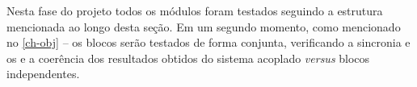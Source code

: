 Nesta fase do projeto todos os módulos foram testados seguindo a estrutura mencionada ao longo desta seção. Em um segundo momento, como mencionado no \autoref{ch-obj} --  os blocos serão testados de forma conjunta, verificando a sincronia e os e a coerência dos resultados obtidos do sistema acoplado \textit{versus} blocos independentes.







